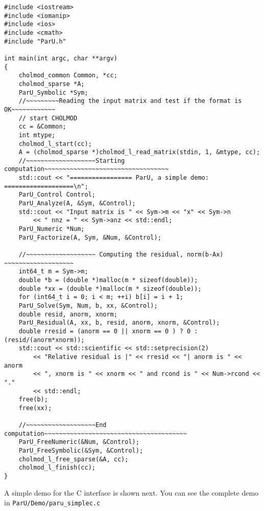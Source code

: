 \documentclass[12pt]{article}
\begin{document}
\begin{verbatim}
#include <iostream>
#include <iomanip>
#include <ios>
#include <cmath>
#include "ParU.h"

int main(int argc, char **argv)
{
    cholmod_common Common, *cc;
    cholmod_sparse *A;
    ParU_Symbolic *Sym;
    //~~~~~~~~~Reading the input matrix and test if the format is OK~~~~~~~~~~~~
    // start CHOLMOD
    cc = &Common;
    int mtype;
    cholmod_l_start(cc);
    A = (cholmod_sparse *)cholmod_l_read_matrix(stdin, 1, &mtype, cc);
    //~~~~~~~~~~~~~~~~~~~Starting computation~~~~~~~~~~~~~~~~~~~~~~~~~~~~~~~~~~
    std::cout << "================= ParU, a simple demo: ===================\n";
    ParU_Control Control;
    ParU_Analyze(A, &Sym, &Control);
    std::cout << "Input matrix is " << Sym->m << "x" << Sym->n
        << " nnz = " << Sym->anz << std::endl;
    ParU_Numeric *Num;
    ParU_Factorize(A, Sym, &Num, &Control);

    //~~~~~~~~~~~~~~~~~~~ Computing the residual, norm(b-Ax) ~~~~~~~~~~~~~~~~~~~
    int64_t m = Sym->m;
    double *b = (double *)malloc(m * sizeof(double));
    double *xx = (double *)malloc(m * sizeof(double));
    for (int64_t i = 0; i < m; ++i) b[i] = i + 1;
    ParU_Solve(Sym, Num, b, xx, &Control);
    double resid, anorm, xnorm;
    ParU_Residual(A, xx, b, resid, anorm, xnorm, &Control);
    double rresid = (anorm == 0 || xnorm == 0 ) ? 0 : (resid/(anorm*xnorm));
    std::cout << std::scientific << std::setprecision(2)
        << "Relative residual is |" << rresid << "| anorm is " << anorm
        << ", xnorm is " << xnorm << " and rcond is " << Num->rcond << "."
        << std::endl;
    free(b);
    free(xx);

    //~~~~~~~~~~~~~~~~~~~End computation~~~~~~~~~~~~~~~~~~~~~~~~~~~~~~~~~~~~~~~
    ParU_FreeNumeric(&Num, &Control);
    ParU_FreeSymbolic(&Sym, &Control);
    cholmod_l_free_sparse(&A, cc);
    cholmod_l_finish(cc);
}
\end{verbatim}

A simple demo for the C interface is shown next. You can see the complete demo
in \verb'ParU/Demo/paru_simplec.c'
\end{document}
